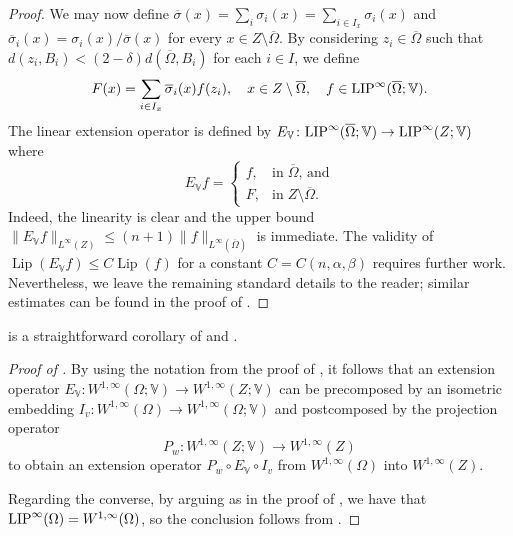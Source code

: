 \documentclass[reqno]{amsart}
\newcommand{\LIP}{{\rm LIP}}
\numberwithin{equation}{section}
\theoremstyle{remark}
\DeclareMathOperator{\lip}{Lip}
\begin{document}
\begin{proof}
We may now define $\overline{\sigma}(x) = \sum_{ i } \sigma_i(x) = \sum_{ i \in I_x } \sigma_i(x)$ and $\overline{\sigma}_i(x) = \sigma_i(x)/\overline{\sigma}(x)$ for every $x \in Z \setminus \overline{\Omega}$. By considering $z_i \in \overline{\Omega}$ such that $d( z_i, B_i ) < (2-\delta) d( \overline{\Omega}, B_i )$ for each $i \in I$, we define
\begin{align*}
    F(x) = \sum_{ i \in I_x } \overline{\sigma}_i(x) f(z_i), \quad x\in Z\setminus \overline\Omega, \quad f \in \LIP^{\infty}( \overline{\Omega}; \mathbb{V} ).
\end{align*}
The linear extension operator is defined by $E_{\mathbb V}\colon \LIP^{\infty}(\overline \Omega;\mathbb V)\to \LIP^{\infty}(Z;\mathbb V)$ where 
$$E_{\mathbb{V}}f=\begin{cases}
    f, & \text{in}\; \overline \Omega\text{, and}\\
    F, & \text{in} \; Z\setminus \overline \Omega.
\end{cases}$$
Indeed, the linearity is clear and the upper bound $\| E_{\mathbb{V}}f \|_{L^{\infty}(Z)} \leq (n+1)\|f\|_{L^{\infty}(\overline{\Omega})}$ is immediate. The validity of $\lip( E_{\mathbb{V}}f ) \leq C \lip(f)$ for a constant $C = C(n,\alpha,\beta)$ requires further work. Nevertheless, we leave the remaining standard details to the reader; similar estimates can be found in the proof of \cite[Theorem 5.2]{La:Sch:05}.
\end{proof}

 is a straightforward corollary of  and .
\begin{proof}[Proof of ]
By using the notation from the proof of , it follows that an extension operator $E_{\mathbb{V}} \colon W^{1,\infty}(\Omega; \mathbb{V}) \rightarrow W^{1,\infty}(Z; \mathbb{V})$ can be precomposed by an isometric embedding $I_v \colon W^{1,\infty}(\Omega) \rightarrow W^{1,\infty}(\Omega;\mathbb V)$ and postcomposed by the projection operator $$P_w \colon W^{1,\infty}(Z; \mathbb{V}) \rightarrow W^{1,\infty}(Z)$$ to obtain an extension operator $P_w \circ E_{\mathbb V} \circ I_v $ from $W^{1,\infty}(\Omega)$ into $W^{1,\infty}(Z)$.

Regarding the converse, by arguing as in the proof of , we have that $\LIP^{\infty}(\Omega)=W^{1,\infty}(\Omega)$, so the conclusion follows from .
\end{proof}
\end{document}
